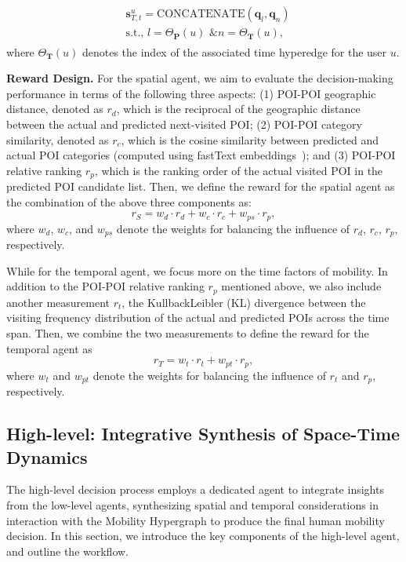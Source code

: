 \documentclass[letterpaper]{article} %
\begin{document}
\begin{align}
\begin{split}
    &\mathbf{s}^{u}_{T, t} = \text{CONCATENATE} (\mathbf{q}_l, \mathbf{q}_n) \\
    &\text{s.t., }l=\Theta_{\mathbf{P}}(u) \text{ \& }
 n=\Theta_{\mathbf{T}}(u), 
 \end{split}
\end{align}
where $\Theta_{\mathbf{T}}(u)$ denotes the index of the associated time hyperedge for the user $u$.


\noindent\textbf{Reward Design. } 
For the spatial agent, we aim to evaluate the decision-making performance in terms of the following three aspects: 
(1) POI-POI geographic distance, denoted as $ r_d $, which is the reciprocal of the geographic distance between the actual and predicted next-visited POI; 
(2) POI-POI category similarity, denoted as $ r_c $, which is the cosine similarity between predicted and actual POI categories (computed using fastText embeddings~\cite{bojanowski2017enriching}); and 
(3) POI-POI relative ranking $ r_p $, which is the ranking order of the actual visited POI in the predicted POI candidate list. 
Then, we define the reward for the spatial agent as the combination of the above three components as:
\begin{equation}
r_{S} = w_{d} \cdot r_{d} + w_{c} \cdot r_{c} + w_{ps} \cdot r_{p}, 
\end{equation}
where  $ w_{d} $, $ w_{c} $, and $ w_{ps} $ denote the weights for balancing the influence of $r_d$, $r_c$, $r_p$, respectively. 

While for the temporal agent, we focus more on the time factors of mobility. 
In addition to the POI-POI relative ranking $ r_p $ mentioned above, we also include another measurement $r_t$, the KullbackLeibler (KL) divergence between the visiting frequency distribution of the actual and predicted POIs across the time span. 
Then, we combine the two measurements to define the reward for the temporal agent as
\begin{equation}
    r_{T} = w_{t} \cdot r_{t} + w_{pt} \cdot r_{p}, 
\end{equation}
where $w_{t}$ and $w_{pt}$ denote the weights for balancing the influence of $r_t$ and $r_p$, respectively.


\subsection{High-level: Integrative Synthesis of Space-Time Dynamics} 
The high-level decision process employs a dedicated agent to integrate insights from the low-level agents, synthesizing spatial and temporal considerations in interaction with the Mobility Hypergraph to produce the final human mobility decision. 
In this section, we introduce the key components of the high-level agent, and outline the workflow.
\end{document}
